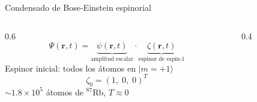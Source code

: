 \documentclass[aspectratio=169]{beamer}
\newcommand{\vb}[1]{\mathbf{#1}}
\begin{document}
	\begin{frame}{Condensado de Bose-Einstein espinorial}
		
		\begin{columns}[c]
			\begin{column}{0.6\textwidth}
				\[
				\Psi(\vb{r},t) = \underbrace{\psi(\vb{r},t)}_{\text{amplitud escalar}}
				\cdot
				\underbrace{\zeta(\vb{r},t)}_{\text{espinor de espín-1}}
				\]
				\vspace{6pt}
				Espinor inicial: todos los átomos en $|m=+1\rangle$
				\[
				\zeta_0 = (1,\;0,\;0)^T
				\]
				\vspace{4pt}
				{\small $\sim\!1.8\times10^5$ átomos de $^{87}$Rb,\; $T\approx 0$}
			\end{column}
			\begin{column}{0.4\textwidth}
				\centering
				
				
				
				\begin{tikzpicture}[x=0.75pt,y=0.75pt,yscale=-1,xscale=1]
					

\end{tikzpicture}
\end{column}
\end{columns}
\end{frame}
\end{document}
